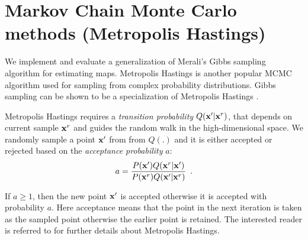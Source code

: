 \documentclass[letterpaper, 10 pt, conference]{ieeeconf} %
\begin{document}
\section{Markov Chain Monte Carlo methods (Metropolis Hastings)}
We implement and evaluate a generalization of Merali's \cite{merali2013icra}
Gibbs sampling algorithm for estimating maps.  Metropolis Hastings is another
popular MCMC algorithm used for sampling from complex probability 
distributions. Gibbs sampling can be shown to be a specialization of Metropolis
Hastings \cite{mackay1998introduction}.


Metropolis Hastings requires a \emph{transition probability} $Q(\mathbf{x}'|
\mathbf{x}^r)$, that depends on current sample $\mathbf{x}^r$ and guides
the random walk in the high-dimensional space. We randomly sample a point
$\mathbf{x}'$ from from $Q(.)$ and it is either accepted or rejected based on the
\emph{acceptance probability} $a$:
\begin{align}
  a = \frac{P(\mathbf{x}')Q(\mathbf{x}^r| \mathbf{x}')}
  {P(\mathbf{x}^r)Q(\mathbf{x}'| \mathbf{x}^r)}
  \enspace.
\end{align}

If $a \ge 1$, then the new point $\mathbf{x}'$ is accepted otherwise it is accepted
with probability $a$. Here acceptance means that the point in the next
iteration is taken as the sampled point otherwise the earlier point is retained.
The interested reader is referred to \cite{mackay1998introduction,LiBOOK2002} for further details about Metropolis Hastings.
\end{document}
